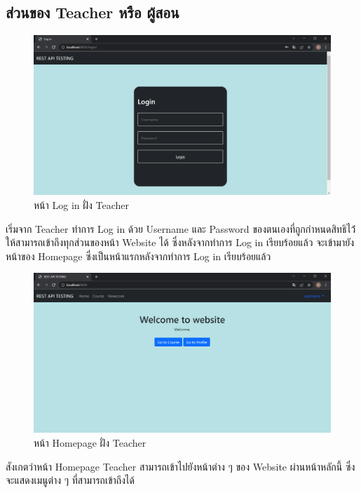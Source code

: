 \subsection{ส่วนของ Teacher หรือ ผู้สอน}

\begin{figure}[H]
    \captionsetup{justification=centering}
    \centering
    \includegraphics[width=5in]{figures/chapter4/login.PNG}
    \caption{หน้า Log in ฝั่ง Teacher}
    \label{figure:login}
\end{figure}
เริ่มจาก Teacher ทำการ Log in ด้วย Username และ Password ของตนเองที่ถูกกำหนดสิทธิไว้่ให้สามารถเข้าถึงทุกส่วนของหน้า Website ได้ ซึ่งหลังจากทำการ Log in เรียบร้อยแล้ว จะเข้ามายังหน้าของ Homepage ซึ่งเป็นหน้าแรกหลังจากทำการ Log in เรียบร้อยแล้ว
\newpage

\begin{figure}[H]
    \captionsetup{justification=centering}
    \centering
    \includegraphics[width=5in]{figures/chapter4/homepage.PNG}
    \caption{หน้า Homepage ฝั่ง Teacher}
    \label{figure:homepage}
\end{figure}
สังเกตว่าหน้า Homepage Teacher สามารถเข้าไปยังหน้าต่าง ๆ ของ Website ผ่านหน้าหลักนี้ ซึ่งจะแสดงเมนูต่าง ๆ ที่สามารถเข้าถึงได้

